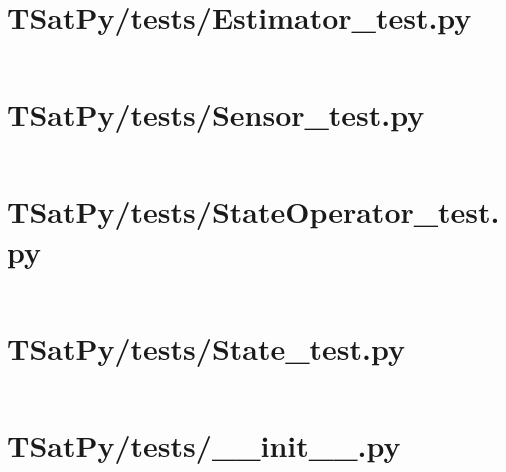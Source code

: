 \pagebreak
\section*{TSatPy/tests/Estimator\_test.py}\label{code:TSatPy/tests/Estimator_test.py}
\inputminted[linenos,fontsize=\scriptsize]{python}{/home/dcouture/git/mathyourlife/TSatPy/TSatPy/tests/Estimator_test.py}

\pagebreak
\section*{TSatPy/tests/Sensor\_test.py}\label{code:TSatPy/tests/Sensor_test.py}
\inputminted[linenos,fontsize=\scriptsize]{python}{/home/dcouture/git/mathyourlife/TSatPy/TSatPy/tests/Sensor_test.py}

\pagebreak
\section*{TSatPy/tests/StateOperator\_test.py}\label{code:TSatPy/tests/StateOperator_test.py}
\inputminted[linenos,fontsize=\scriptsize]{python}{/home/dcouture/git/mathyourlife/TSatPy/TSatPy/tests/StateOperator_test.py}

\pagebreak
\section*{TSatPy/tests/State\_test.py}\label{code:TSatPy/tests/State_test.py}
\inputminted[linenos,fontsize=\scriptsize]{python}{/home/dcouture/git/mathyourlife/TSatPy/TSatPy/tests/State_test.py}

\pagebreak
\section*{TSatPy/tests/\_\_init\_\_.py}\label{code:TSatPy/tests/__init__.py}
\inputminted[linenos,fontsize=\scriptsize]{python}{/home/dcouture/git/mathyourlife/TSatPy/TSatPy/tests/__init__.py}
